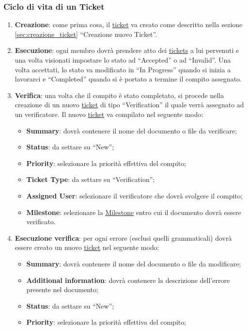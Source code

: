\subsubsection{Ciclo di vita di un Ticket}
\label{sec:ciclo_vita_ticket}
\begin{enumerate}
\item \textbf{Creazione}: come prima cosa, il \underline{ticket} va creato come descritto nella sezione \ref{sec:creazione_ticket} ``Creazione nuovo Ticket''.
\item \textbf{Esecuzione}: ogni membro dovrà prendere atto dei \underline{tickets} a lui pervenuti e una volta visionati impostare lo stato ad ``Accepted'' o ad ``Invalid''. Una volta accettati, lo stato va modificato in ``In Progress'' quando si inizia a lavorarci e ``Completed'' quando si è portato a termine il compito assegnato.
\item \textbf{Verifica}: una volta che il compito è stato completato, si procede nella creazione di un nuovo \underline{ticket} di tipo ``Verification'' il quale verrà assegnato ad un verificatore. Il nuovo \underline{ticket} va compilato nel seguente modo:
\begin{itemize}
\item \textbf{Summary}: dovrà contenere il nome del documento o file da verificare;
\item \textbf{Status}: da settare su ``New'';
\item \textbf{Priority}: selezionare la priorità effettiva del compito;
\item \textbf{Ticket Type}: da settare su ``Verification'';
\item \textbf{Assigned User}: selezionare il verificatore che dovrà svolgere il compito;
\item \textbf{Milestone}: selezionare la \underline{Milestone} entro cui il documento dovrà essere verificato.
\end{itemize}
\item \textbf{Esecuzione verifica}: per ogni errore (esclusi quelli grammaticali) dovrà essere creato un nuovo \underline{ticket} nel seguente modo:
\begin{itemize}
\item \textbf{Summary}: dovrà contenere il nome del documento o file da modificare;
\item \textbf{Additional information}: dovrà contenere la descrizione dell'errore presente nel documento;
\item \textbf{Status}: da settare su ``New'';
\item \textbf{Priority}: selezionare la priorità effettiva del compito;

\end{itemize}
\end{enumerate}
